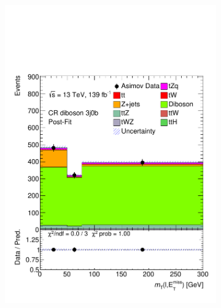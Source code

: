 \begin{figure}[!h]
\begin{subfigure}[b]{0.33\linewidth}
    \includegraphics[width=\textwidth]{ubonn-thesis/Chapters/Chapters_07/Figure/Asmiov/CR_3j0b_postFit.pdf} 
    \caption{}
  \end{subfigure}%
  \newline
  \centering
  \begin{subfigure}[b]{0.33\linewidth}

\end{subfigure}
\end{figure}
